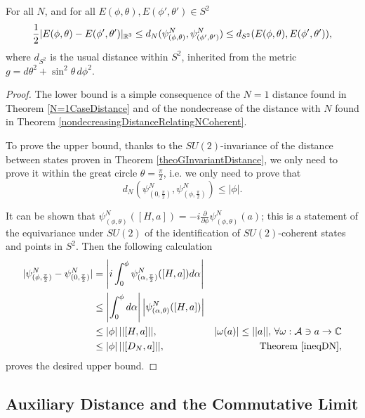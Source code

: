 \begin{theorem}\label{geometricDistanceCommutativeUpperBound}
For all $N$, and for all $E(\phi, \theta), E(\phi', \theta') \in S^2$
\begin{equation}
    \frac{1}{2}|E(\phi, \theta)- E(\phi', \theta')|_{\RR^3}  \leq d_N(\psi^N_{(\phi, \theta)}, \psi^N_{(\phi', \theta')}) \leq d_{S^2}(E(\phi, \theta), E(\phi', \theta')),
\end{equation}
where $d_{S^2}$ is the usual distance within $S^2$, inherited from the metric $g = d\theta^2 + \sin^2 \theta \, d\phi^2$.
\end{theorem}
\begin{proof}
The lower bound is a simple consequence of the $N = 1$ distance found in Theorem \ref{N=1CaseDistance} and of the nondecrease of the distance with $N$ found in Theorem \ref{nondecreasingDistanceRelatingNCoherent}.

To prove the upper bound, thanks to the $SU(2)$-invariance of the distance between states proven in Theorem \ref{theoGInvariantDistance}, we only need to prove it within the great circle $\theta = \frac{\pi}{2}$, i.e. we only need to prove that 
\begin{equation*}
    d_N(\psi^N_{(0, \frac{\pi}{2})}, \psi^N_{(\phi, \frac{\pi}{2})}) \leq |\phi|.
\end{equation*}

It can be shown that $\psi^N_{(\phi, \theta)}([H, a]) = -i \frac{\partial}{\partial \phi} \psi^N_{(\phi, \theta)}(a)$; this is a statement of the equivariance under $SU(2)$ of the identification of $SU(2)$-coherent states and points in $S^2$. Then the following calculation
\begin{align*}
    |\psi^N_{(\phi, \frac{\pi}{2})} - \psi^N_{(0, \frac{\pi}{2})}| 
        &= \left|i \int_0^\phi \psi^N_{(\alpha, \frac{\pi}{2})}([H, a]) d\alpha \right|  \\
        &\leq \left| \int_0^\phi d\alpha \right| \left| \psi^N_{(\alpha, \theta)}([H, a]) \right|\\
        &\leq |\phi|\,||[H, a]||, 
        & |\omega(a)| \leq ||a||,\,\forall\omega: \acal \ni a \to \CC\\
        &\leq |\phi|\, ||[D_N, a]||,    & \text{Theorem \ref{ineqDN}},
\end{align*}
proves the desired upper bound.
\end{proof}
\subsection{Auxiliary Distance and the Commutative Limit}
\label{ChFSSectionLimit}

